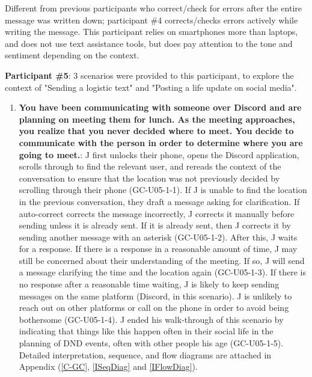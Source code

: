 \documentclass[acmsmall,screen,authorversion,nonacm]{acmart}
\begin{document}
Different from previous participants who correct/check for errors after the entire message was written down; participant \#4 corrects/checks errors actively while writing the message. This participant relies on smartphones more than laptops, and does not use text assistance tools, but does pay attention to the tone and sentiment depending on the context. 

\vspace{7pt}

\textbf{Participant \#5}: 3 scenarios were provided to this participant, to explore the context of "Sending a logistic text" and "Posting a life update on social media".

\begin{enumerate}
    \item \textbf{You have been communicating with someone over Discord and are planning on meeting them for lunch. As the meeting approaches, you realize that you never decided where to meet. You decide to communicate with the person in order to determine where you are going to meet.}: J first unlocks their phone, opens the Discord application, scrolls through to find the relevant user, and rereads the context of the conversation to ensure that the location was not previously decided by scrolling through their phone (GC-U05-1-1). If J is unable to find the location in the previous conversation, they draft a message asking for clarification. If auto-correct corrects the message incorrectly, J corrects it manually before sending unless it is already sent. If it is already sent, then J corrects it by sending another message with an asterisk (GC-U05-1-2). After this, J waits for a response. If there is a response in a reasonable amount of time, J may still be concerned about their understanding of the meeting. If so, J will send a message clarifying the time and the location again (GC-U05-1-3). If there is no response after a reasonable time waiting, J is likely to keep sending messages on the same platform (Discord, in this scenario). J is unlikely to reach out on other platforms or call on the phone in order to avoid being bothersome (GC-U05-1-4). J ended his walk-through of this scenario by indicating that things like this happen often in their social life in the planning of DND events, often with other people his age (GC-U05-1-5). Detailed interpretation, sequence, and flow diagrams are attached in Appendix (\ref{C-GC}, \ref{ISeqDiag} and \ref{IFlowDiag}). 


\end{enumerate}
\end{document}
